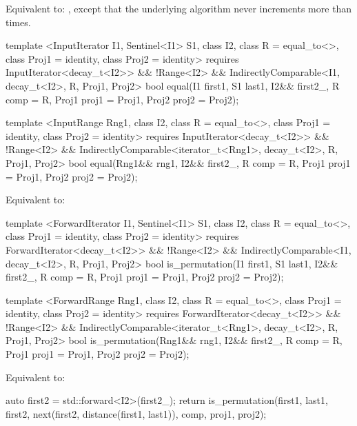 \pnum
\effects
Equivalent to: ,
except that the underlying algorithm never increments  more than  times.

\begin{codeblock}
template <InputIterator I1, Sentinel<I1> S1, class I2,
    class R = equal_to<>, class Proj1 = identity, class Proj2 = identity>
  requires InputIterator<decay_t<I2>> && !Range<I2> &&
    IndirectlyComparable<I1, decay_t<I2>, R, Proj1, Proj2>
  bool equal(I1 first1, S1 last1, I2&& first2_, R comp = R{},
             Proj1 proj1 = Proj1{}, Proj2 proj2 = Proj2{});

template <InputRange Rng1, class I2, class R = equal_to<>,
    class Proj1 = identity, class Proj2 = identity>
  requires InputIterator<decay_t<I2>> && !Range<I2> &&
    IndirectlyComparable<iterator_t<Rng1>, decay_t<I2>, R, Proj1, Proj2>
  bool equal(Rng1&& rng1, I2&& first2_, R comp = R{},
             Proj1 proj1 = Proj1{}, Proj2 proj2 = Proj2{});
\end{codeblock}

\pnum
\effects
Equivalent to: 

\begin{codeblock}
template <ForwardIterator I1, Sentinel<I1> S1, class I2,
    class R = equal_to<>, class Proj1 = identity, class Proj2 = identity>
  requires ForwardIterator<decay_t<I2>> && !Range<I2> &&
    IndirectlyComparable<I1, decay_t<I2>, R, Proj1, Proj2>
  bool is_permutation(I1 first1, S1 last1, I2&& first2_, R comp = R{},
                      Proj1 proj1 = Proj1{}, Proj2 proj2 = Proj2{});

template <ForwardRange Rng1, class I2, class R = equal_to<>,
    class Proj1 = identity, class Proj2 = identity>
  requires ForwardIterator<decay_t<I2>> && !Range<I2> &&
    IndirectlyComparable<iterator_t<Rng1>, decay_t<I2>, R, Proj1, Proj2>
  bool is_permutation(Rng1&& rng1, I2&& first2_, R comp = R{},
                      Proj1 proj1 = Proj1{}, Proj2 proj2 = Proj2{});
\end{codeblock}

\pnum
\effects
Equivalent to:
\begin{codeblock}
  auto first2 = std::forward<I2>(first2_);
  return is_permutation(first1, last1, first2, next(first2, distance(first1, last1)),
                        comp, proj1, proj2);
\end{codeblock}

